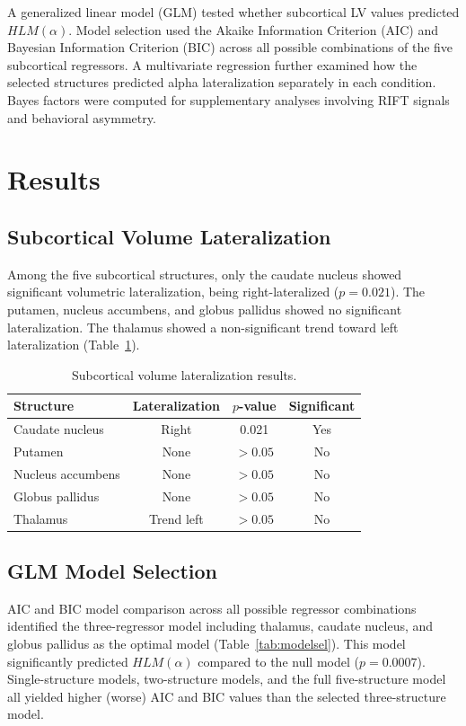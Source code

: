 \documentclass[12pt]{article}
\begin{document}
A generalized linear model (GLM) tested whether subcortical LV values predicted $HLM(\alpha)$. Model selection used the Akaike Information Criterion (AIC) and Bayesian Information Criterion (BIC) across all possible combinations of the five subcortical regressors. A multivariate regression further examined how the selected structures predicted alpha lateralization separately in each condition. Bayes factors \citep{kass1995bayes} were computed for supplementary analyses involving RIFT signals and behavioral asymmetry.

\section{Results}

\subsection{Subcortical Volume Lateralization}

Among the five subcortical structures, only the caudate nucleus showed significant volumetric lateralization, being right-lateralized ($p = 0.021$). The putamen, nucleus accumbens, and globus pallidus showed no significant lateralization. The thalamus showed a non-significant trend toward left lateralization (Table~\ref{tab:lateralization}).

\begin{table}[ht]
\centering
\caption{Subcortical volume lateralization results.}
\label{tab:lateralization}
\begin{tabular}{lccc}
\toprule
Structure & Lateralization & $p$-value & Significant \\
\midrule
Caudate nucleus & Right & 0.021 & Yes \\
Putamen & None & $> 0.05$ & No \\
Nucleus accumbens & None & $> 0.05$ & No \\
Globus pallidus & None & $> 0.05$ & No \\
Thalamus & Trend left & $> 0.05$ & No \\
\bottomrule
\end{tabular}
\end{table}

\subsection{GLM Model Selection}

AIC and BIC model comparison across all possible regressor combinations identified the three-regressor model including thalamus, caudate nucleus, and globus pallidus as the optimal model (Table~\ref{tab:modelsel}). This model significantly predicted $HLM(\alpha)$ compared to the null model ($p = 0.0007$). Single-structure models, two-structure models, and the full five-structure model all yielded higher (worse) AIC and BIC values than the selected three-structure model.
\end{document}
